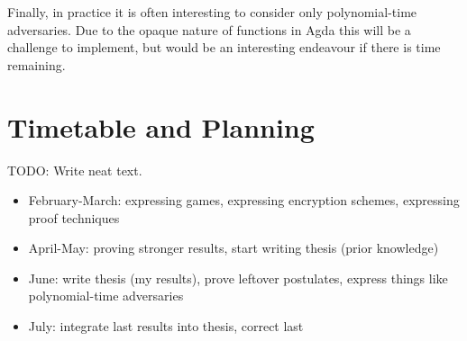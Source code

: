 \documentclass{article}
\begin{document}
    Finally, in practice it is often interesting to consider only polynomial-time adversaries.  Due to the opaque nature
    of functions in Agda this will be a challenge to implement, but would be an interesting endeavour if there is
    time remaining.

    \section{Timetable and Planning}

    TODO: Write neat text.
    \begin{itemize}
        \itemsep0em
        \item February-March: expressing games, expressing encryption schemes, expressing proof techniques
        \item April-May: proving stronger results, start writing thesis (prior knowledge)
        \item June: write thesis (my results), prove leftover postulates, express things like polynomial-time adversaries
        \item July: integrate last results into thesis, correct last
    \end{itemize}

    
    
\end{document}
